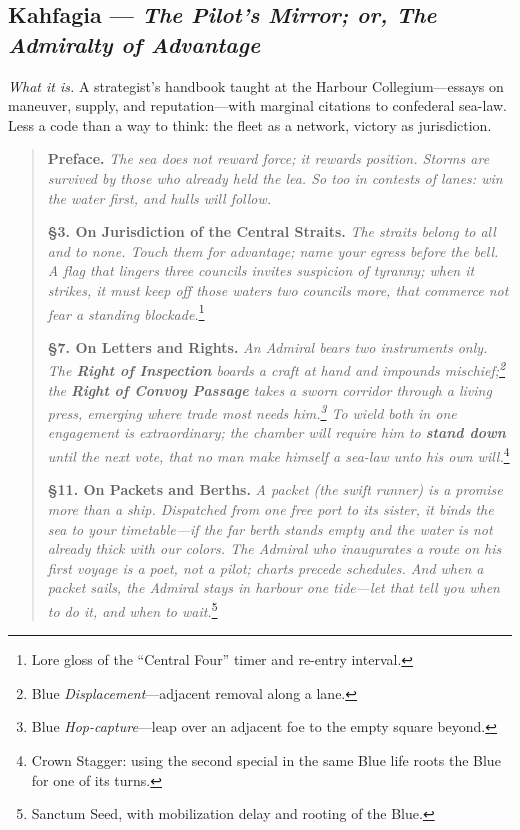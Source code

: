 \documentclass[11pt]{article}
\begin{document}
\clearpage

\subsection{Kahfagia --- \textit{The Pilot's Mirror; or, The Admiralty of Advantage}}
\textit{What it is.} A strategist's handbook taught at the Harbour Collegium---essays on maneuver, supply, and reputation---with marginal citations to confederal sea-law. Less a code than a way to think: the fleet as a network, victory as jurisdiction.

\begin{quote}\small
\textbf{Preface.} \emph{The sea does not reward force; it rewards position. Storms are survived by those who already held the lea. So too in contests of lanes: win the water first, and hulls will follow.}

\medskip
\textbf{§3. On Jurisdiction of the Central Straits.} \emph{The straits belong to all and to none. Touch them for advantage; name your egress before the bell. A flag that lingers three councils invites suspicion of tyranny; when it strikes, it must keep off those waters two councils more, that commerce not fear a standing blockade.}\footnote{Lore gloss of the ``Central Four'' timer and re-entry interval.}

\medskip
\textbf{§7. On Letters and Rights.} \emph{An Admiral bears two instruments only. The \textbf{Right of Inspection} boards a craft at hand and impounds mischief;\footnote{Blue \emph{Displacement}---adjacent removal along a lane.} the \textbf{Right of Convoy Passage} takes a sworn corridor through a living press, emerging where trade most needs him.\footnote{Blue \emph{Hop-capture}---leap over an adjacent foe to the empty square beyond.} To wield both in one engagement is extraordinary; the chamber will require him to \textbf{stand down} until the next vote, that no man make himself a sea-law unto his own will.}\footnote{Crown Stagger: using the second special in the same Blue life roots the Blue for one of its turns.}

\medskip
\textbf{§11. On Packets and Berths.} \emph{A packet (the swift runner) is a promise more than a ship. Dispatched from one free port to its sister, it binds the sea to your timetable---if the far berth stands empty and the water is not already thick with our colors. The Admiral who inaugurates a route on his \emph{first} voyage is a poet, not a pilot; charts precede schedules. And when a packet sails, the Admiral stays in harbour one tide---let that tell you when to do it, and when to wait.}\footnote{Sanctum Seed, with mobilization delay and rooting of the Blue.}


\end{quote}
\end{document}

